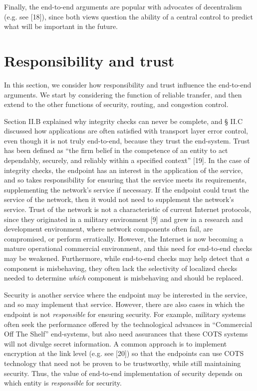 \documentclass[a4paper,11pt,notitlepage,twoside,openright]{article}
\begin{document}
Finally, the end-to-end arguments are popular with advocates of
decentralism (e.g. see {[}18{]}), since both views question the ability
of a central control to predict what will be important in the future.

\hypertarget{responsibility-and-trust}{%
\section{Responsibility and trust}\label{responsibility-and-trust}}

In this section, we consider how responsibility and trust influence the
end-to-end arguments. We start by considering the function of reliable
transfer, and then extend to the other functions of security, routing,
and congestion control.

Section II.B explained why integrity checks can never be complete, and \S
II.C discussed how applications are often satisfied with transport layer
error control, even though it is not truly end-to-end, because they
trust the end-system. Trust has been defined as ``the firm belief in the
competence of an entity to act dependably, securely, and reliably within
a specified context'' {[}19{]}. In the case of integrity checks, the
endpoint has an interest in the application of the service, and so takes
responsibility for ensuring that the service meets its requirements,
supplementing the network's service if necessary. If the endpoint could
trust the service of the network, then it would not need to supplement
the network's service. Trust of the network is not a characteristic of
current Internet protocols, since they originated in a military
environment {[}9{]} and grew in a research and development environment,
where network components often fail, are compromised, or perform
erratically. However, the Internet is now becoming a mature operational
commercial environment, and this need for end-to-end checks may be
weakened. Furthermore, while end-to-end checks may help detect that
\emph{a} component is misbehaving, they often lack the selectivity of
localized checks needed to determine \emph{which} component is
misbehaving and should be replaced.

Security is another service where the endpoint may be interested in the
service, and so may implement that service. However, there are also
cases in which the endpoint is not \emph{responsible} for ensuring
security. For example, military systems often seek the performance
offered by the technological advances in ``Commercial Off The Shelf''
end-systems, but also need assurances that these COTS systems will not
divulge secret information. A common approach is to implement encryption
at the link level (e.g. see {[}20{]}) so that the endpoints can use COTS
technology that need not be proven to be trustworthy, while still
maintaining security. Thus, the value of end-to-end implementation of
security depends on which entity is \emph{responsible} for security.
\end{document}
